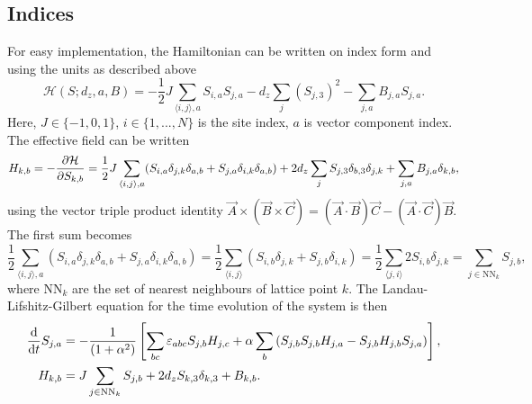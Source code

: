 \documentclass{article}
\begin{document}
    \subsection*{Indices}
    For easy implementation, the Hamiltonian can be written on index form and using the units as described above
    \begin{equation}
        \mathcal{H}(S; d_z, a, B) = -\frac{1}{2} J \sum_{\langle i, j \rangle, a} S_{i, a} S_{j, a} - d_z \sum_{j} (S_{j,3})^2 -  \sum_{j, a} B_{j, a} S_{j,a}.
        \label{hamiltonian}
    \end{equation}
    Here, $J\in\{-1, 0, 1\}$, $i\in\{1, ..., N\}$ is the site index, $a$ is vector component index.
    The effective field can be written
    \begin{align*}
        H_{k, b} = - \pdv{\mathcal{H}}{S_{k, b}} = \frac{1}{2} J \sum_{\langle i, j \rangle, a} (S_{i, a}\delta_{j,k}\delta_{a, b} + S_{j, a}\delta_{i,k}\delta_{a, b}) + 2 d_z \sum_{j} S_{j,3} \delta_{b, 3}\delta_{j, k} +  \sum_{j, a} B_{j, a} \delta_{k,b},
    \end{align*}
    using the vector triple product identity $\vec A \times (\vec B \times \vec C) = (\vec A \cdot \vec B) \vec C - (\vec A \cdot \vec C) \vec B$.
    The first sum becomes
    \begin{equation*}
        \frac{1}{2}\sum_{\langle i, j \rangle, a} (S_{i, a}\delta_{j,k}\delta_{a, b} + S_{j, a}\delta_{i,k}\delta_{a, b}) = \frac{1}{2}\sum_{\langle i, j \rangle} (S_{i, b}\delta_{j,k} + S_{j, b}\delta_{i,k}) = \frac{1}{2}\sum_{\langle j, i \rangle} 2S_{i, b} \delta_{j, k} = \sum_{j \in \mathrm{NN}_k} S_{j, b},
    \end{equation*}
    where $\mathrm{NN}_k$ are the set of nearest neighbours of lattice point $k$.
    The Landau-Lifshitz-Gilbert equation for the time evolution of the system is then
    \begin{align}
        \dv{t} S_{j, a} &= - \frac{1}{(1 + \alpha^2)}\left[\sum_{b c}\varepsilon_{abc}S_{j, b}H_{j,c} + \alpha \sum_{b}\left(S_{j, b}S_{j, b}H_{j, a} - S_{j, b}H_{j, b}S_{j, a}\right)\right], \label{LLG} \\
        H_{k, b} &= J\sum_{j \in \mathrm{NN}_k} S_{j, b} + 2d_z S_{k, 3} \delta_{k, 3} +  B_{k, b}.
        \label{effective field}
    \end{align}

    
\end{document}

